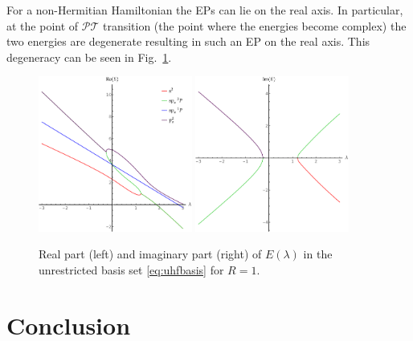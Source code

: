 \documentclass[11pt,a4paper]{article}
\newcommand{\pt}{$\mathcal{PT}$}
\begin{document}
For a non-Hermitian Hamiltonian the EPs can lie on the real axis. In particular, at the point of {\pt} transition (the point where the energies become complex) the two energies are degenerate resulting in such an EP on the real axis. This degeneracy can be seen in Fig.~\ref{fig:UHFPT}.

\begin{figure}
    \centering
    \includegraphics[width=0.45\textwidth]{ReNRJPT.pdf}
    \includegraphics[width=0.45\textwidth]{ImNRJPT.pdf}
    \caption{\centering Real part (left) and imaginary part (right) of $E(\lambda)$ in the unrestricted basis set \eqref{eq:uhfbasis} for $R=1$.}
    \label{fig:UHFPT}
\end{figure}

\section{Conclusion}
\end{document}
